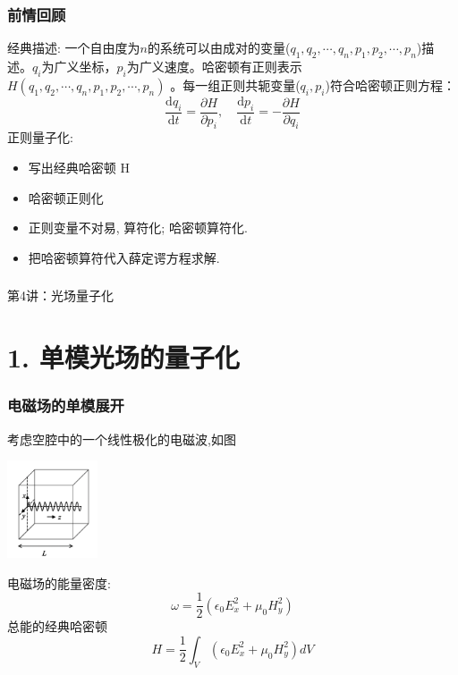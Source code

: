 \begin{frame}
    \frametitle{前情回顾}
    {\Bullet} 经典描述: 一个自由度为$n$的系统可以由成对的变量($q_1, q_2, \cdots, q_n, p_1, p_2, \cdots, p_n$)描述。$q_i$为广义坐标，$p_i$为广义速度。哈密顿有正则表示$H(q_1, q_2, \cdots, q_n, p_1, p_2, \cdots, p_n) $ 。每一组正则共轭变量($q_i, p_i$)符合哈密顿正则方程：
    \[ \frac{\mathrm{d} q_i }{\mathrm{d} t}  = \frac{\partial H }{\partial p_i}, \quad \frac{\mathrm{d} p_i }{\mathrm{d} t}  = - \frac{\partial H }{\partial q_i}\]
    {\Bullet} 正则量子化: 
    \begin{itemize}
        \item 写出经典哈密顿 H
        \item 哈密顿正则化
        \item 正则变量不对易, 算符化; 哈密顿算符化.
        \item 把哈密顿算符代入薛定谔方程求解.
    \end{itemize}     
\end{frame}

\begin{frame} [plain]
    \frametitle{}
    \Background[1] 
    \begin{center}
    {\huge 第4讲：光场量子化}
    \end{center}  
    \addtocounter{framenumber}{-1}   
\end{frame}


\section{1. 单模光场的量子化}

\begin{frame}
      \frametitle{电磁场的单模展开}
    考虑空腔中的一个线性极化的电磁波,如图 
    \begin{center}
     \includegraphics[width=0.20\textwidth]{figs/2022-04-27-12-37-33.png}
    \end{center}
    电磁场的能量密度: 
    \[ \omega = \frac{1}{2} (\epsilon_0 E^2 _x + \mu_0 H^2 _y) \]
    总能的经典哈密顿
    \[ H = \frac{1}{2} \int_V (\epsilon_0 E^2 _x + \mu_0 H^2 _y) dV \]      
\end{frame}

